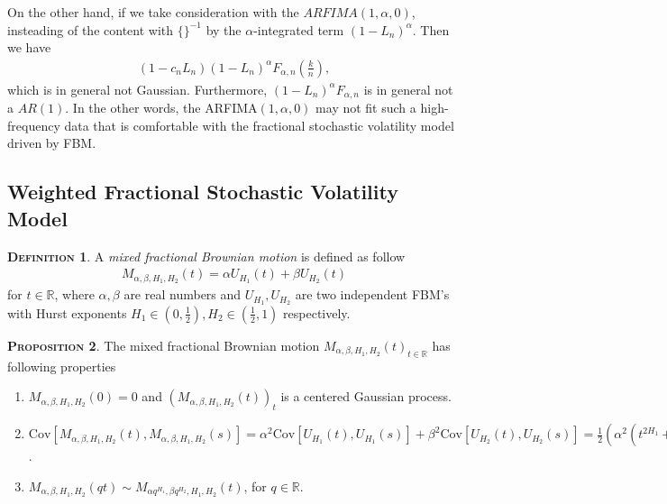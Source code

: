 \documentclass[a4paper, twoside, 11pt]{article}
\theoremstyle{definition}
\newtheorem{definition}{\scshape Definition}[section]
\newtheorem{proposition}[definition]{\scshape Proposition}
\newcommand{\brkt}[1]{\left({#1} \right)}
\begin{document}
On the other hand, if we take consideration with the $ARFIMA(1, \alpha, 0)$, insteading of the content with $\{\}^{-1}$ by the $\alpha$-integrated term $(1-L_n)^\alpha$. Then we have
\begin{eqnarray*}
  (1-c_nL_n) (1-L_n)^\alpha F_{\alpha,n}(\frac{k}{n}),
\end{eqnarray*}
which is in general not Gaussian. Furthermore, $(1-L_n)^\alpha F_{\alpha,n}$ is in general not a $AR(1)$.  In the other words, the ARFIMA$(1, \alpha, 0)$ may not fit such a high-frequency data that is comfortable with the fractional stochastic volatility model driven by FBM. 

\subsection{Weighted Fractional Stochastic Volatility Model}
\begin{definition}
  A \emph{mixed fractional Brownian motion} is defined as follow
\begin{eqnarray}
  M_{\alpha,\beta,H_1,H_2}(t) = \alpha U_{H_1}(t) + \beta U_{H_2}(t)
  \label{sec:mfsv}
\end{eqnarray}
for $t\in \mathbb{R}$, where $\alpha, \beta$ are real numbers and $U_{H_1}, U_{H_2}$ are two independent FBM's with Hurst exponents $H_1 \in (0, \frac{1}{2}), H_2 \in (\frac{1}{2}, 1)$ respectively.
\end{definition}

\begin{proposition}
  The mixed fractional Brownian motion $M_{\alpha,\beta,H_1,H_2}(t)_{t\in\mathbb{R}}$ has following properties
   \begin{enumerate}[topsep=0pt, itemsep=-1ex, partopsep=1ex, parsep=1ex, label=(\roman*)]
	 \item $M_{\alpha,\beta,H_1,H_2}(0) = 0$ and $(M_{\alpha,\beta,H_1,H_2}(t))_t$ is a centered Gaussian  process.
	 \item $\mathrm{Cov}[M_{\alpha,\beta,H_1,H_2}(t), M_{\alpha,\beta,H_1,H_2}(s)] = \alpha^2 \mathrm{Cov}[U_{H_1}(t), U_{H_1}(s)] + \beta^2\mathrm{Cov}[U_{H_2}(t), U_{H_2}(s)] = \frac{1}{2}\brkt{\alpha^2(t^{2H_1}+s^{2H_1}+|t-s|^{2H_1}) + \beta^2(t^{2H_2} + s^{2H_2} + |t-s|^{2H_2})}$. 
	 \item $M_{\alpha, \beta, H_1, H_2}(qt) \sim M_{\alpha q^{H_1}, \beta q^{H_2}, H_1, H_2}(t)$, for $q\in\mathbb{R}$.
	 \end{enumerate}
	 \label{sec:prop}
\end{proposition}
\end{document}
